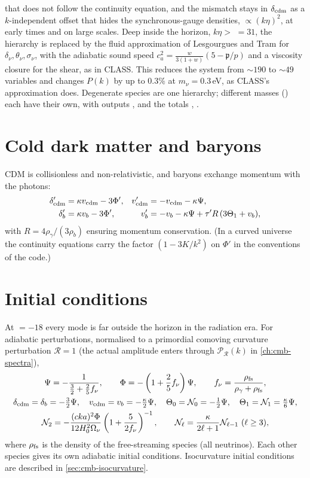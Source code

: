 that does not follow the continuity equation, and the mismatch stays in $\delta_{\rm cdm}$ as a $k$-independent offset
that hides the synchronous-gauge densities, $\propto(k\eta)^2$, at early times and on large scales. Deep inside the horizon, $k\eta>$  $=31$,
the hierarchy is replaced by the fluid approximation of Lesgourgues and Tram \cite{LesgourguesTram2011} for
$\delta_\nu,\theta_\nu,\sigma_\nu$, with the adiabatic sound speed $c_a^2=\frac{w}{3(1+w)}(5-\mathfrak p/p)$ and a
viscosity closure for the shear, as in CLASS. This reduces the system from $\sim190$ to $\sim49$ variables and changes
$P(k)$ by up to $0.3\%$ at $m_\nu=0.3$\,eV, as CLASS's approximation does. Degenerate species are one hierarchy;
different masses () each have their own, with outputs ,  and the
totals , .

\section{Cold dark matter and baryons}

CDM is collisionless and non-relativistic, and baryons exchange momentum with the photons:
\begin{align}
\delta_{\rm cdm}'&=\kappa v_{\rm cdm}-3\Phi', & v_{\rm cdm}'&=-v_{\rm cdm}-\kappa\Psi,\\
\delta_b'&=\kappa v_b-3\Phi', & v_b'&=-v_b-\kappa\Psi+\tau'R\,(3\Theta_1+v_b),
\end{align}
with $R=4\rho_\gamma/(3\rho_b)$ ensuring momentum conservation. (In a curved universe the continuity equations carry
the factor $(1-3K/k^2)$ on $\Phi'$ in the conventions of the code.)

\section{Initial conditions}\label{sec:pert-ic}

At  $=-18$ every mode is far outside the horizon in the radiation era. For adiabatic
perturbations, normalised to a primordial comoving curvature perturbation $\mathcal R=1$ (the actual amplitude enters
through $\mathcal P_\mathcal R(k)$ in \cref{ch:cmb-spectra}),
\begin{gather}
\Psi=-\frac{1}{\frac32+\frac25f_\nu},\qquad \Phi=-\left(1+\frac25f_\nu\right)\Psi,\qquad
f_\nu=\frac{\rho_{\rm fs}}{\rho_\gamma+\rho_{\rm fs}},\\
\delta_{\rm cdm}=\delta_b=-\tfrac32\Psi,\quad v_{\rm cdm}=v_b=-\tfrac\kappa2\Psi,\quad
\Theta_0=\mathcal N_0=-\tfrac12\Psi,\quad \Theta_1=\mathcal N_1=\tfrac\kappa6\Psi,\\
\mathcal N_2=-\frac{(cka)^2\Phi}{12H_0^2\Omega_\nu}\left(1+\frac{5}{2f_\nu}\right)^{-1},\qquad
\mathcal N_\ell=\frac{\kappa}{2\ell+1}\mathcal N_{\ell-1}\ (\ell\ge3),
\end{gather}
where $\rho_{\rm fs}$ is the density of the free-streaming species (all neutrinos). Each other species gives its
own adiabatic initial conditions. Isocurvature initial conditions are described in \cref{sec:cmb-isocurvature}.

